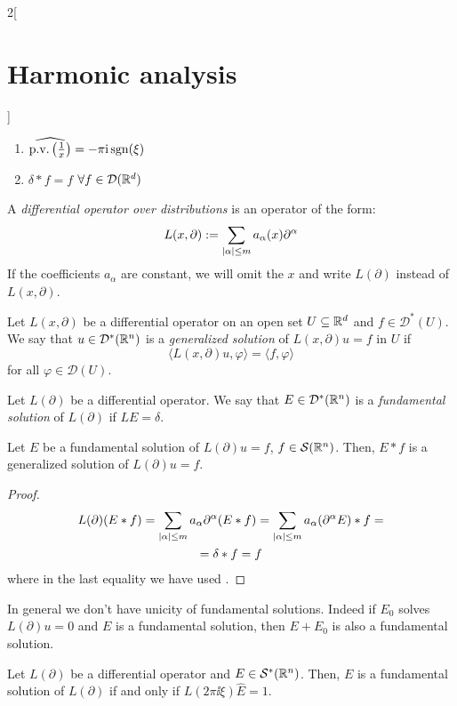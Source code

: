 \documentclass[../../../main_math.tex]{subfiles}
\begin{document}
\begin{multicols}{2}[\section{Harmonic analysis}]
\begin{lemma}
\begin{enumerate}
      \item $\widehat{\mathrm{p.v.}\left(\frac{1}{x}\right)}=-\pi \mathrm{i} \operatorname{sgn}(\xi)$
      \item $\delta*f=f$ $\forall f\in \mathcal{D}(\mathbb{R}^d)$
    \end{enumerate}
  \end{lemma}
  \begin{definition}
    A \emph{differential operator over distributions} is an operator of the form:
    $$
      L(x,\partial):=\sum_{\abs{\alpha}\leq m}a_\alpha(x)\partial^\alpha
    $$
    If the coefficients $a_\alpha$ are constant, we will omit the $x$ and write $L(\partial)$ instead of $L(x,\partial)$.
  \end{definition}
  \begin{definition}
    Let $L(x,\partial)$ be a differential operator on an open set $U\subseteq\mathbb{R}^d$ and $f\in \mathcal{D}^*(U)$. We say that $u\in\mathcal{D}^*(\mathbb{R}^n)$ is a \emph{generalized solution} of $L(x,\partial)u=f$ in $U$ if
    $$
      \langle L(x,\partial)u,\varphi\rangle=\langle f,\varphi\rangle
    $$
    for all $\varphi\in \mathcal{D}(U)$.
  \end{definition}
  \begin{definition}
    Let $L(\partial)$ be a differential operator. We say that $E\in\mathcal{D}^*(\mathbb{R}^n)$ is a \emph{fundamental solution} of $L(\partial)$ if $LE=\delta$.
  \end{definition}
  \begin{theorem}
    Let $E$ be a fundamental solution of $L(\partial)u=f$, $f\in\mathcal{S}(\mathbb{R}^n)$. Then, $E*f$ is a generalized solution of $L(\partial)u=f$.
  \end{theorem}
  \begin{proof}
    \begin{multline*}
      L(\partial)(E*f)=\sum_{\abs{\alpha}\leq m}a_\alpha\partial^\alpha(E*f)=\sum_{\abs{\alpha}\leq m}a_\alpha(\partial^\alpha E)*f=\\=\delta*f=f
    \end{multline*}
    where in the last equality we have used .
  \end{proof}
  \begin{remark}
    In general we don't have unicity of fundamental solutions. Indeed if $E_0$ solves $L(\partial)u=0$ and $E$ is a fundamental solution, then $E+E_0$ is also a fundamental solution.
  \end{remark}
  \begin{theorem}
    Let $L(\partial)$ be a differential operator and $E\in\mathcal{S}^*(\mathbb{R}^n)$. Then, $E$ is a fundamental solution of $L(\partial)$ if and only if $L(2\pi\ii\xi)\widehat{E}=1$.

\end{theorem}
\end{multicols}
\end{document}
